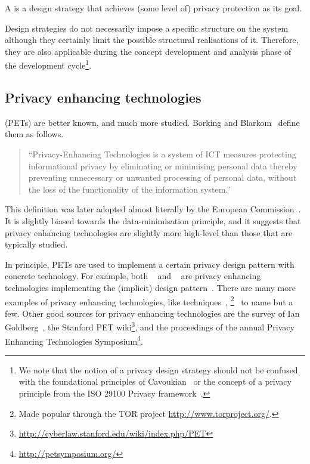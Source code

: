 A  is a design strategy that achieves (some level of) privacy protection as its goal. 

Design strategies do not necessarily impose a specific structure on the system although they certainly limit the possible structural realisations of it. Therefore, they are also applicable during the concept development and analysis phase of the development cycle\footnote{We note that the notion of a privacy design strategy should not be confused
  with the foundational principles of Cavoukian~\cite{cavoukian2011pbd}
  or the concept of a privacy principle from the ISO 29100 Privacy
  framework~\cite{ISO29100}.
}.




\subsection{Privacy enhancing technologies}

 (PETs) are better known, and much more studied. Borking and Blarkom~\etal\cite{borking1996identityprotector,blarkom2003pet} define them as follows.
\begin{quote}
``Privacy-Enhancing Technologies is a system of ICT measures protecting informational privacy by eliminating or minimising personal data thereby preventing unnecessary or unwanted processing of personal data, without the loss of the functionality of the information system.''
\end{quote}
This definition was later adopted almost literally by the European Commission~\cite{COM(2007)228}. It is slightly biased towards the data-minimisation principle, and it suggests that privacy enhancing technologies are slightly more high-level than those that are typically studied. 

In principle, PETs are used to implement a certain privacy design pattern with concrete technology. For example, both ~\cite{DBLP:conf/eurocrypt/CamenischL01} and ~\cite{brands2000pki} are privacy enhancing technologies implementing the (implicit) design pattern~.
There are many more examples of privacy enhancing technologies, like  techniques~\cite{DBLP:conf/crypto/ChaumFN88}, 
\footnote{Made popular through the TOR project \url{http://www.torproject.org/}.
}~\cite{DBLP:journals/cacm/Chaum81} to name but a few. Other good sources for privacy enhancing technologies are the survey of Ian Goldberg~\cite{DBLP:conf/pet/Goldberg02}, the Stanford PET wiki\footnote{\url{http://cyberlaw.stanford.edu/wiki/index.php/PET}
}, and the proceedings of the annual Privacy Enhancing Technologies Symposium\footnote{\url{http://petsymposium.org/}
}.

